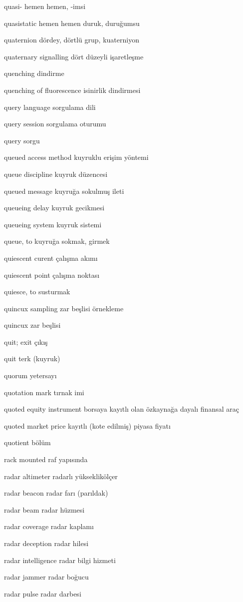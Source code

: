 \documentclass[12pt,fleqn]{article}\usepackage{../../common}
\begin{document}
quasi- hemen hemen, -imsi

quasistatic hemen hemen duruk, duruğumsu

quaternion dördey, dörtlü grup, kuaterniyon

quaternary signalling dört düzeyli işaretleşme

quenching dindirme

quenching of fluorescence isinirlik dindirmesi

query language sorgulama dili

query session sorgulama oturumu

query sorgu

queued access method kuyruklu erişim yöntemi

queue discipline kuyruk düzencesi

queued message kuyruğa sokulmuş ileti

queueing delay kuyruk gecikmesi

queueing system kuyruk sistemi

queue, to kuyruğa sokmak, girmek

quiescent curent çalışma akımı

quiescent point çalışma noktası

quiesce, to susturmak

quincux sampling zar beşlisi örnekleme

quincux zar beşlisi

quit; exit çıkış

quit terk (kuyruk)

quorum yetersayı

quotation mark tırnak imi

quoted equity instrument borsaya kayıtlı olan özkaynağa dayalı finansal araç

quoted market price kayıtlı (kote edilmiş) piyasa fiyatı

quotient bölüm

rack mounted raf yapısında

radar altimeter radarlı yükseklikölçer

radar beacon radar farı (parıldak)

radar beam radar hüzmesi

radar coverage radar kaplamı

radar deception radar hilesi

radar intelligence radar bilgi hizmeti

radar jammer radar boğucu

radar pulse radar darbesi
\end{document}

